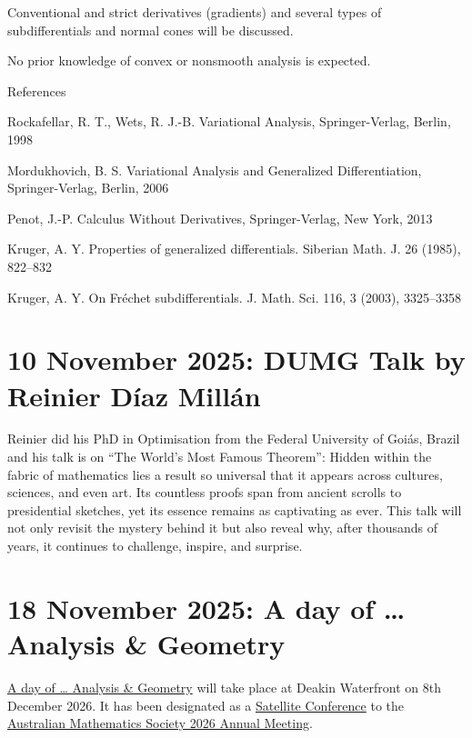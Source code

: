 \documentclass[10pt,twoside,a5paper]{scrreprt}
\begin{document}
      Conventional and strict derivatives (gradients) and several types of subdifferentials and normal cones will be discussed.

      No prior knowledge of convex or nonsmooth analysis is expected.

      References

      Rockafellar, R. T., Wets, R. J.-B. Variational Analysis, Springer-Verlag, Berlin, 1998

      Mordukhovich, B. S. Variational Analysis and Generalized Differentiation, Springer-Verlag, Berlin, 2006

      Penot, J.-P. Calculus Without Derivatives, Springer-Verlag, New York, 2013

      Kruger, A. Y. Properties of generalized differentials. Siberian Math. J. 26 (1985), 822–832

      Kruger, A. Y. On Fréchet subdifferentials. J. Math. Sci. 116, 3 (2003), 3325–3358 


  \section*{10 November 2025: DUMG Talk by Reinier Díaz Millán}

  Reinier did his PhD in Optimisation from the Federal University of
  Goiás, Brazil and his talk is on ``The World's Most Famous Theorem'':
  Hidden within the fabric of mathematics lies a result so universal
  that it appears across cultures, sciences, and even art. Its countless
  proofs span from ancient scrolls to presidential sketches, yet its
  essence remains as captivating as ever. This talk will not only
  revisit the mystery behind it but also reveal why, after thousands of
  years, it continues to challenge, inspire, and surprise.

  \section*{18 November 2025: A day of \ldots{} Analysis \& Geometry}

  \href{https://tinyurl.com/AnalysisGeometryDeakin}{A day of \ldots{}
  Analysis \& Geometry} will take place at Deakin Waterfront on 8th
  December 2026. It has been designated as a
  \href{https://austms2025.org.au/satellites}{Satellite Conference} to
  the \href{https://www.austms2025.org.au}{Australian Mathematics
  Society 2026 Annual Meeting}.
\end{document}
